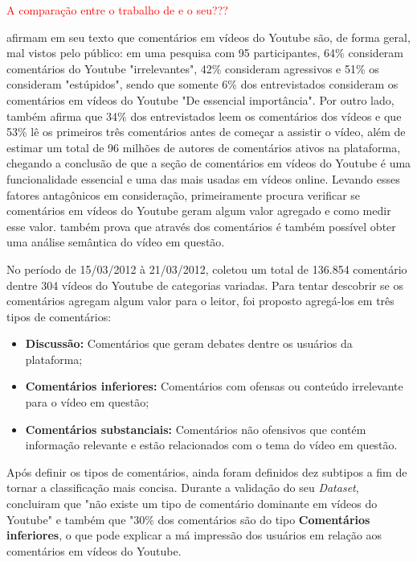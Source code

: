 \textcolor{red}{A comparação entre o trabalho de  e o seu???}

 afirmam em seu texto que comentários em vídeos do Youtube são, de forma geral, mal vistos pelo público: em uma pesquisa com 95 participantes, 64\% consideram comentários do Youtube "irrelevantes", 42\% consideram agressivos e 51\% os consideram "estúpidos", sendo que somente 6\% dos entrevistados consideram os comentários em vídeos do Youtube "De essencial importância". Por outro lado,  também afirma que 34\% dos entrevistados leem os comentários dos vídeos e que 53\% lê os primeiros três comentários antes de começar a assistir o vídeo, além de estimar um total de 96 milhões de autores de comentários ativos na plataforma, chegando a conclusão de que a seção de comentários em vídeos do Youtube é uma funcionalidade essencial e uma das mais usadas em vídeos online. Levando esses fatores antagônicos em consideração, \cite{schultes2013leave} primeiramente procura verificar se comentários em vídeos do Youtube geram algum valor agregado e como medir esse valor. \cite{schultes2013leave} também prova que através dos comentários é também possível obter uma análise semântica do vídeo em questão. 

No período de 15/03/2012 à 21/03/2012, \cite{schultes2013leave} coletou um total de 136.854 comentário dentre 304 vídeos do Youtube de categorias variadas. Para tentar descobrir se os comentários agregam algum valor para o leitor, foi proposto agregá-los em três tipos de comentários:
\begin{itemize}
    \item \textbf{Discussão:} Comentários que geram debates dentre os usuários da plataforma;
    \item \textbf{Comentários inferiores:} Comentários com ofensas ou conteúdo irrelevante para o vídeo em questão; 
   \item \textbf{Comentários substanciais:} Comentários não ofensivos que contém informação relevante e estão relacionados com o tema do vídeo em questão.
\end{itemize}
Após definir os tipos de comentários, ainda foram definidos dez subtipos a fim de tornar a classificação mais concisa. %
Durante a validação do seu \textit{Dataset},  concluiram que "não existe um tipo de comentário dominante em vídeos do Youtube" e também que "30\% dos comentários são do tipo \textbf{Comentários inferiores}, o que pode explicar a má impressão dos usuários em relação aos comentários em vídeos do Youtube.

